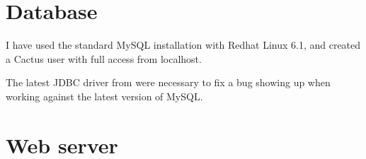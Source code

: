 \section{Database}

I have used the standard MySQL installation with Redhat Linux 6.1, and
created a Cactus user with full access from localhost.

The latest JDBC driver from  were necessary to fix a bug showing up when working
  against the latest version of MySQL.


\section{Web server}














